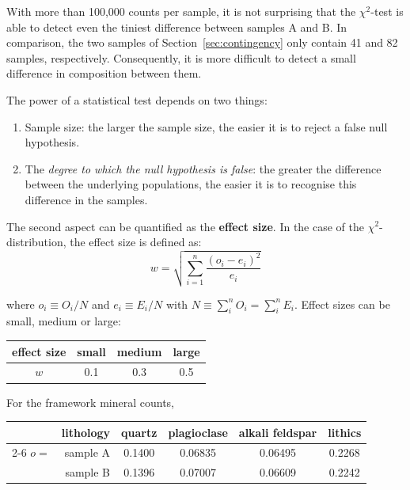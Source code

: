 With more than 100,000 counts per sample, it is not surprising that
the $\chi^2$-test is able to detect even the tiniest difference
between samples A and B.  In comparison, the two samples of
Section~\ref{sec:contingency} only contain 41 and 82 samples,
respectively. Consequently, it is more difficult to detect a small
difference in composition between them.\medskip

The power of a statistical test depends on two things:

\begin{enumerate}
  \item Sample size: the larger the sample size, the easier it is to
    reject a false null hypothesis.
  \item The \emph{degree to which the null hypothesis is false}: the
    greater the difference between the underlying populations, the
    easier it is to recognise this difference in the samples.
\end{enumerate}

The second aspect can be quantified as the \textbf{effect size}. In
the case of the $\chi^2$-distribution, the effect size is defined as:
\begin{equation}
  w = \sqrt{\sum\limits_{i=1}^{n}\frac{\left(o_i-e_i\right)^2}{e_i}}
  \label{eq:effectsize}
\end{equation}

\noindent where $o_i \equiv O_i/N$ and $e_i \equiv E_i/N$ with $N
\equiv \sum_{i}^{n}O_i = \sum_{i}^{n}E_i$.  Effect sizes can be small,
medium or large:

\begin{center}
  \begin{tabular}{c|ccc}
    effect size & small & medium & large \\ \hline
    $w$ & 0.1 & 0.3 & 0.5
  \end{tabular}
\end{center}

For the framework mineral counts,

\begin{center}
  \begin{tabular}{rr|cccc}
    & lithology & quartz & plagioclase & alkali feldspar & lithics  \\
    \cline{2-6}
    $o =$ & sample A & 0.1400 & 0.06835 & 0.06495 & 0.2268 \\
    & sample B & 0.1396 & 0.07007 & 0.06609 & 0.2242
  \end{tabular}
\end{center}

